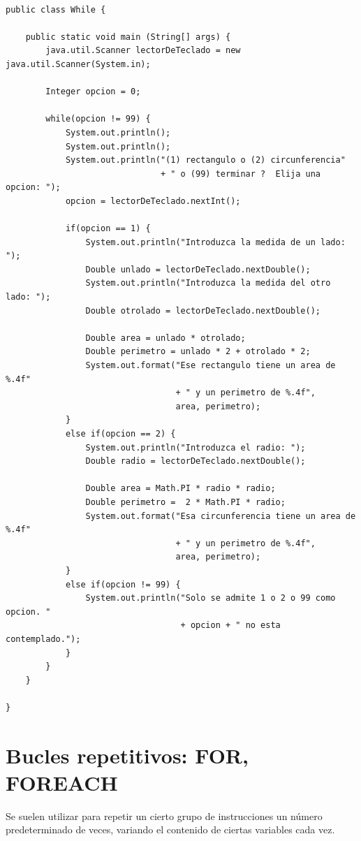 \documentclass[spanish,12pt,a4paper,final,oneside]{book}
\begin{document}
\begin{lstlisting}[frame=single, caption=lenguaje java]

public class While {
	
    public static void main (String[] args) {
        java.util.Scanner lectorDeTeclado = new java.util.Scanner(System.in);
        
        Integer opcion = 0;
        
        while(opcion != 99) {
            System.out.println();
            System.out.println();
            System.out.println("(1) rectangulo o (2) circunferencia"
                               + " o (99) terminar ?  Elija una opcion: ");
            opcion = lectorDeTeclado.nextInt();

            if(opcion == 1) {
                System.out.println("Introduzca la medida de un lado: ");
                Double unlado = lectorDeTeclado.nextDouble();
                System.out.println("Introduzca la medida del otro lado: ");
                Double otrolado = lectorDeTeclado.nextDouble();   

                Double area = unlado * otrolado;
                Double perimetro = unlado * 2 + otrolado * 2;
                System.out.format("Ese rectangulo tiene un area de %.4f"
                                  + " y un perimetro de %.4f",
                                  area, perimetro);
            }
            else if(opcion == 2) {
                System.out.println("Introduzca el radio: ");
                Double radio = lectorDeTeclado.nextDouble();

                Double area = Math.PI * radio * radio;
                Double perimetro =  2 * Math.PI * radio;
                System.out.format("Esa circunferencia tiene un area de %.4f"
                                  + " y un perimetro de %.4f",
                                  area, perimetro);
            }
            else if(opcion != 99) {
                System.out.println("Solo se admite 1 o 2 o 99 como opcion. " 
                                   + opcion + " no esta contemplado.");
            }
        }
    }
    
}
\end{lstlisting}



\section{Bucles repetitivos: FOR, FOREACH}
Se suelen utilizar para repetir un cierto grupo de instrucciones un número predeterminado de veces, variando el contenido de ciertas variables cada vez.
\end{document}
